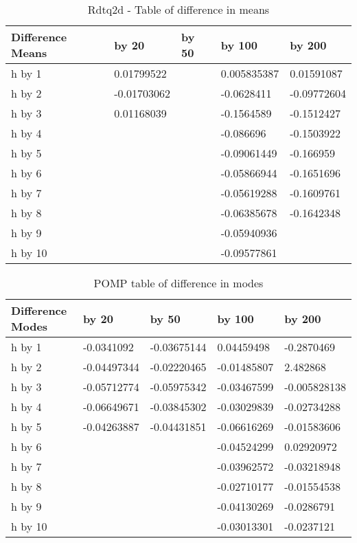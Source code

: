 \documentclass[a4paper,11pt]{article}
\begin{document}
\begin{table}[h]
\centering
\caption{Rdtq2d - Table of difference in means}
\begin{tabular}{|l|l|l|l|l|}
\hline
Difference Means & by 20       & by 50 & by 100      & by 200      \\ \hline
h by 1           & 0.01799522  &       & 0.005835387 & 0.01591087  \\ \hline
h by 2           & -0.01703062 &       & -0.0628411  & -0.09772604 \\ \hline
h by 3           & 0.01168039  &       & -0.1564589  & -0.1512427  \\ \hline
h by 4           &             &       & -0.086696   & -0.1503922  \\ \hline
h by 5           &             &       & -0.09061449 & -0.166959   \\ \hline
h by 6           &             &       & -0.05866944 & -0.1651696  \\ \hline
h by 7           &             &       & -0.05619288 & -0.1609761  \\ \hline
h by 8           &             &       & -0.06385678 & -0.1642348  \\ \hline
h by 9           &             &       & -0.05940936 &             \\ \hline
h by 10          &             &       & -0.09577861 &             \\ \hline
\end{tabular}
\end{table}


\begin{table}[h]
\centering
\caption{POMP table of difference in modes}
\begin{tabular}{|l|l|l|l|l|}
\hline
Difference Modes & by 20       & by 50       & by 100      & by 200       \\ \hline
h by 1           & -0.0341092  & -0.03675144 & 0.04459498  & -0.2870469   \\ \hline
h by 2           & -0.04497344 & -0.02220465 & -0.01485807 & 2.482868     \\ \hline
h by 3           & -0.05712774 & -0.05975342 & -0.03467599 & -0.005828138 \\ \hline
h by 4           & -0.06649671 & -0.03845302 & -0.03029839 & -0.02734288  \\ \hline
h by 5           & -0.04263887 & -0.04431851 & -0.06616269 & -0.01583606  \\ \hline
h by 6           &             &             & -0.04524299 & 0.02920972   \\ \hline
h by 7           &             &             & -0.03962572 & -0.03218948  \\ \hline
h by 8           &             &             & -0.02710177 & -0.01554538  \\ \hline
h by 9           &             &             & -0.04130269 & -0.0286791   \\ \hline
h by 10          &             &             & -0.03013301 & -0.0237121   \\ \hline
\end{tabular}
\end{table}
\end{document}
